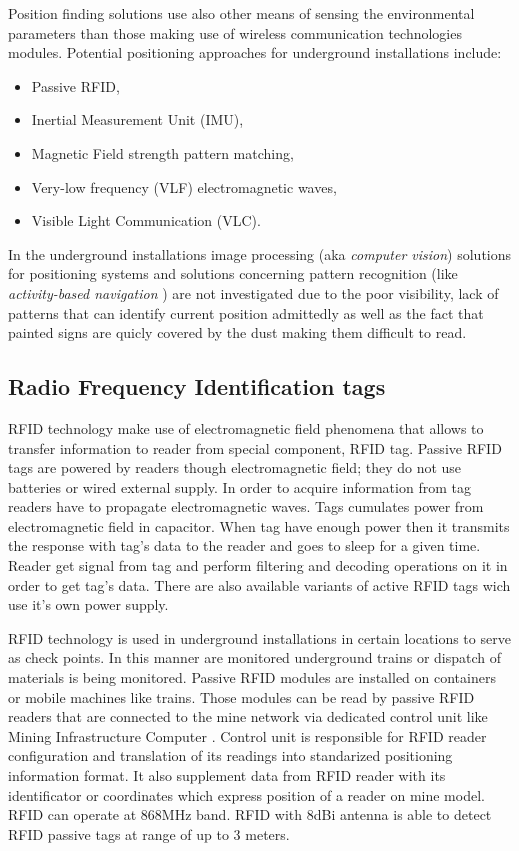 \documentclass[../main.tex]{subfiles}
\begin{document}
Position finding solutions use also other means of sensing the environmental parameters than those making use of wireless communication technologies modules. Potential positioning approaches for underground installations include:
\begin{itemize}
	\item Passive RFID,
	\item Inertial Measurement Unit (IMU),
	\item Magnetic Field strength pattern matching,
	\item Very-low frequency (VLF) electromagnetic waves,
	\item Visible Light Communication (VLC).
\end{itemize}

In the underground installations image processing (aka \textit{computer vision}) solutions for positioning systems and solutions concerning pattern recognition (like \textit{activity-based navigation} \cite{article_visual_points_AR_navi}) are not investigated due to the poor visibility, lack of patterns that can identify current position admittedly as well as the fact that painted signs are quicly covered by the dust making them difficult to read.


\subsection{Radio Frequency Identification tags} %
\label{sub:rfid_tags}

RFID technology make use of electromagnetic field phenomena that allows to transfer information to reader from special component, RFID tag. Passive RFID tags are powered by readers though electromagnetic field; they do not use batteries or wired external supply. In order to acquire information from tag readers have to propagate electromagnetic waves. Tags cumulates power from electromagnetic field in capacitor. When tag have enough power then it transmits the response with tag's data to the reader and goes to sleep for a given time. Reader get signal from tag and perform filtering and decoding operations on it in order to get tag's data. There are also available variants of active RFID tags wich use it's own power supply.

RFID technology is used in underground installations in certain locations to serve as check points. In this manner are monitored underground trains or dispatch of materials is being monitored. Passive RFID modules are installed on containers or mobile machines like trains. Those modules can be read by passive RFID readers that are connected to the mine network via dedicated control unit like Mining Infrastructure Computer \cite{Thesis_CM}. Control unit is responsible for RFID reader configuration and translation of its readings into standarized positioning information format. It also supplement data from RFID reader with its identificator or coordinates which express position of a reader on mine model. RFID can operate at 868MHz band. RFID with 8dBi antenna is able to detect RFID passive tags at range of up to 3 meters.
\end{document}
